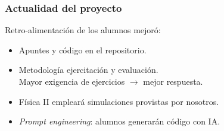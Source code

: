 \documentclass[aspectratio=169]{beamer}
\begin{document}
\begin{frame}
	\frametitle{Actualidad del proyecto}
	\pause
	\begin{block}{}
		\begin{description}[<+->]
			\item [2023] Retro-alimentación de los alumnos mejoró:
				\begin{itemize}
					\item Apuntes y código en el repositorio.
					\item Metodología ejercitación y evaluación.\\
							Mayor exigencia de ejercicios \(\rightarrow\) mejor respuesta.
				\end{itemize}
			\item [2024] 
				\begin{itemize}
					\item Física II empleará simulaciones provistas por nosotros.
					\item \emph{Prompt engineering}: alumnos generarán código con IA.
				\end{itemize}
		\end{description}
	\end{block}
\end{frame}
\end{document}

